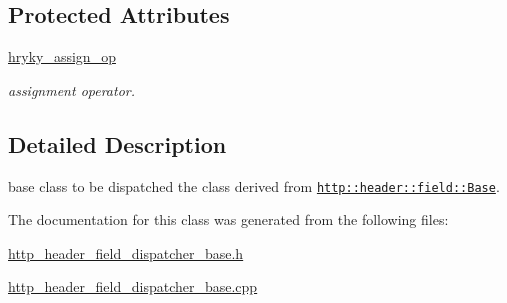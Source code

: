 \subsection*{Protected Attributes}
\begin{DoxyCompactItemize}
\item 
\hypertarget{classhryky_1_1http_1_1header_1_1field_1_1dispatcher_1_1_base_a40c34ada6910c5e49c0b263fe59593e6}{\hyperlink{classhryky_1_1http_1_1header_1_1field_1_1dispatcher_1_1_base_a40c34ada6910c5e49c0b263fe59593e6}{hryky\-\_\-assign\-\_\-op}}\label{classhryky_1_1http_1_1header_1_1field_1_1dispatcher_1_1_base_a40c34ada6910c5e49c0b263fe59593e6}

\begin{DoxyCompactList}\small\item\em assignment operator. \end{DoxyCompactList}\end{DoxyCompactItemize}


\subsection{Detailed Description}
base class to be dispatched the class derived from \href{http::header::field::Base}{\tt http\-::header\-::field\-::\-Base}. 

The documentation for this class was generated from the following files\-:\begin{DoxyCompactItemize}
\item 
\hyperlink{http__header__field__dispatcher__base_8h}{http\-\_\-header\-\_\-field\-\_\-dispatcher\-\_\-base.\-h}\item 
\hyperlink{http__header__field__dispatcher__base_8cpp}{http\-\_\-header\-\_\-field\-\_\-dispatcher\-\_\-base.\-cpp}\end{DoxyCompactItemize}
